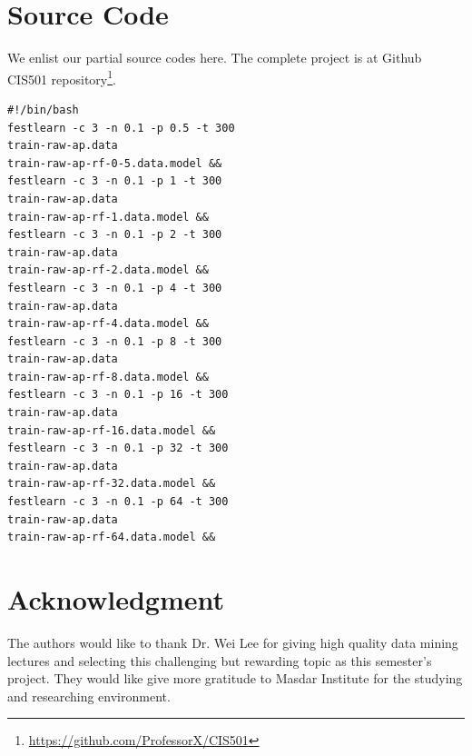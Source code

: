\documentclass[journal]{IEEEtran}
\begin{document}
\appendices
\section{Source Code}

We enlist our partial source codes here. The complete project is at
Github CIS501
repository\footnote{\url{https://github.com/ProfessorX/CIS501}}. 
\begin{verbatim}
#!/bin/bash
festlearn -c 3 -n 0.1 -p 0.5 -t 300 
train-raw-ap.data 
train-raw-ap-rf-0-5.data.model &&
festlearn -c 3 -n 0.1 -p 1 -t 300 
train-raw-ap.data 
train-raw-ap-rf-1.data.model &&
festlearn -c 3 -n 0.1 -p 2 -t 300 
train-raw-ap.data 
train-raw-ap-rf-2.data.model &&
festlearn -c 3 -n 0.1 -p 4 -t 300 
train-raw-ap.data 
train-raw-ap-rf-4.data.model &&
festlearn -c 3 -n 0.1 -p 8 -t 300 
train-raw-ap.data 
train-raw-ap-rf-8.data.model &&
festlearn -c 3 -n 0.1 -p 16 -t 300 
train-raw-ap.data 
train-raw-ap-rf-16.data.model &&
festlearn -c 3 -n 0.1 -p 32 -t 300 
train-raw-ap.data 
train-raw-ap-rf-32.data.model &&
festlearn -c 3 -n 0.1 -p 64 -t 300 
train-raw-ap.data 
train-raw-ap-rf-64.data.model &&
\end{verbatim}

\section*{Acknowledgment}


The authors would like to thank Dr. Wei Lee for giving high quality data mining lectures and selecting this challenging but rewarding topic as this semester's project. They would like give more gratitude to Masdar Institute for the studying and researching environment.


\ifCLASSOPTIONcaptionsoff
  \newpage
\fi



\end{document}
